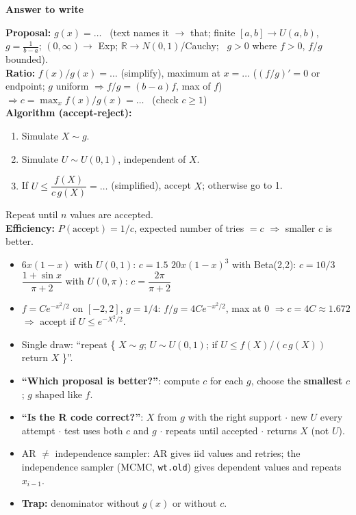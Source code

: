 \documentclass[10pt]{article}
\newcommand{\R}[1]{\texttt{#1}}
\newcommand{\trap}[1]{\textcolor{trap}{\textbf{Trap:} #1}}
\newcommand{\Q}[1]{\textbf{``#1''}}
\newcommand{\sub}[1]{\par\vspace{4pt}{\bfseries #1}\par\vspace{1pt}}
\newenvironment{answer}[1][Answer to write]{\par\vspace{2pt}\begin{shaded}\small\textbf{#1}\par\vspace{1pt}}{\end{shaded}\vspace{-2pt}}
\begin{document}
\begin{answer}
\textbf{Proposal:} $g(x)=\dots$ \ (text names it $\to$ that; finite $[a,b]\to U(a,b)$, $g=\frac1{b-a}$; $(0,\infty)\to$ Exp; $\mathbb R\to N(0,1)$/Cauchy; \ $g>0$ where $f>0$, $f/g$ bounded).\\
\textbf{Ratio:} $f(x)/g(x)=\dots$ (simplify), maximum at $x=\dots$ ($(f/g)'=0$ or endpoint; $g$ uniform $\Rightarrow f/g=(b-a)f$, max of $f$) $\Rightarrow c=\max_x f(x)/g(x)=\dots$ \ (check $c\ge1$)\\[2pt]
\textbf{Algorithm (accept-reject):}
\begin{enumerate}
\item Simulate $X\sim g$.
\item Simulate $U\sim U(0,1)$, independent of $X$.
\item If $U\le \dfrac{f(X)}{c\,g(X)}=\dots$ (simplified), accept $X$; otherwise go to 1.
\end{enumerate}
Repeat until $n$ values are accepted.\\
\textbf{Efficiency:} $P(\text{accept})=1/c$, expected number of tries $=c$ $\Rightarrow$ smaller $c$ is better.
\end{answer}
\sub{Worked examples}
\begin{itemize}
\item $6x(1-x)$ with $U(0,1)$: $c=1.5$ \quad $20x(1-x)^3$ with Beta(2,2): $c=10/3$ \quad $\dfrac{1+\sin x}{\pi+2}$ with $U(0,\pi)$: $c=\dfrac{2\pi}{\pi+2}$
\item $f=Ce^{-x^2/2}$ on $[-2,2]$, $g=1/4$: $f/g=4Ce^{-x^2/2}$, max at 0 $\Rightarrow c=4C\approx1.672$ $\Rightarrow$ accept if $U\le e^{-X^2/2}$.
\end{itemize}
\sub{Variants}
\begin{itemize}
\item Single draw: ``repeat \{ $X\sim g$; $U\sim U(0,1)$; if $U\le f(X)/(c\,g(X))$ return $X$ \}''.
\item \Q{Which proposal is better?}: compute $c$ for each $g$, choose the \textbf{smallest} $c$; $g$ shaped like $f$.
\item \Q{Is the R code correct?}: $X$ from $g$ with the right support $\cdot$ new $U$ every attempt $\cdot$ test uses both $c$ and $g$ $\cdot$ repeats until accepted $\cdot$ returns $X$ (not $U$).
\item AR $\ne$ independence sampler: AR gives iid values and retries; the independence sampler (MCMC, \R{wt.old}) gives dependent values and repeats $x_{i-1}$.
\item \trap{denominator without $g(x)$ or without $c$.}
\end{itemize}
\end{document}
